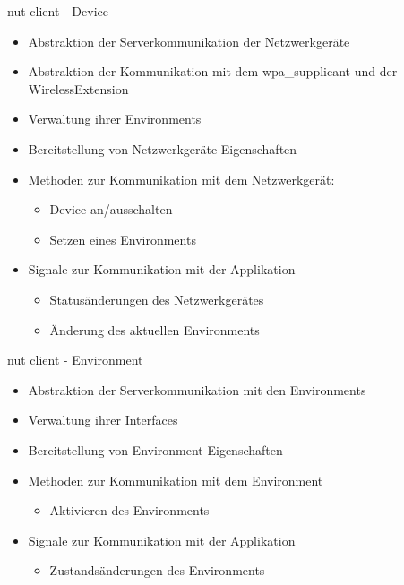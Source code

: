\begin{frame}[<+-| alert@+>]{nut client - Device}
	\begin{itemize}
		\item Abstraktion der Serverkommunikation der Netzwerkgeräte
		\item Abstraktion der Kommunikation mit dem wpa\_supplicant und der WirelessExtension
		\item Verwaltung ihrer Environments
		\item Bereitstellung von Netzwerkgeräte-Eigenschaften
		\item Methoden zur Kommunikation mit dem Netzwerkgerät:
		\begin{itemize}
			\item Device an/ausschalten
			\item Setzen eines Environments
		\end{itemize}
		\item Signale zur Kommunikation mit der Applikation
		\begin{itemize}
			\item Statusänderungen des Netzwerkgerätes
			\item Änderung des aktuellen Environments
		\end{itemize}
	\end{itemize}
\end{frame}

\begin{frame}[<+-| alert@+>]{nut client - Environment}
	\begin{itemize}
		\item Abstraktion der Serverkommunikation mit den Environments
		\item Verwaltung ihrer Interfaces
		\item Bereitstellung von Environment-Eigenschaften
		\item Methoden zur Kommunikation mit dem Environment
		\begin{itemize}
			\item Aktivieren des Environments
		\end{itemize}
		\item Signale zur Kommunikation mit der Applikation
		\begin{itemize}
			\item Zustandsänderungen des Environments
		\end{itemize}
	\end{itemize}
\end{frame}

